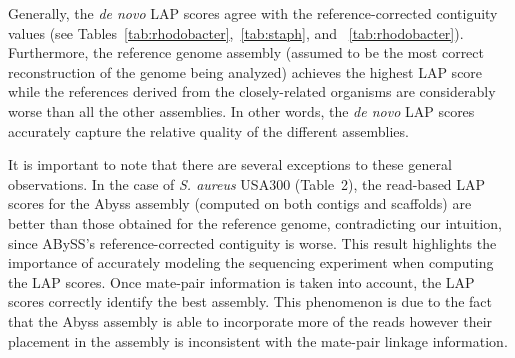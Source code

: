 Generally, the \emph{de novo} LAP scores agree with the reference-corrected contiguity
values (see Tables~\ref{tab:rhodobacter},~\ref{tab:staph}, and ~\ref{tab:rhodobacter}).  Furthermore, the reference genome assembly (assumed to be the
most correct reconstruction of the genome being analyzed) achieves the
highest LAP score while the references derived from the closely-related
organisms are considerably worse than all the other assemblies.  In
other words, the \emph{de novo} LAP scores accurately capture the
relative quality of the different assemblies.

It is important to note that there are several exceptions to
these general observations. In the case of \emph{S. aureus} USA300 (Table~2),
the read-based LAP scores for the Abyss assembly (computed on both
contigs and scaffolds) are better than those obtained for the
reference genome, contradicting our intuition, since ABySS's reference-corrected contiguity is
worse. This result highlights the importance of accurately modeling
the sequencing experiment when computing the LAP scores.  Once
mate-pair information is taken into account, the LAP scores correctly
identify the best assembly.  This phenomenon is due to the fact that
the Abyss assembly is able to incorporate more of the reads however
their placement in the assembly is inconsistent with the mate-pair
linkage information.


